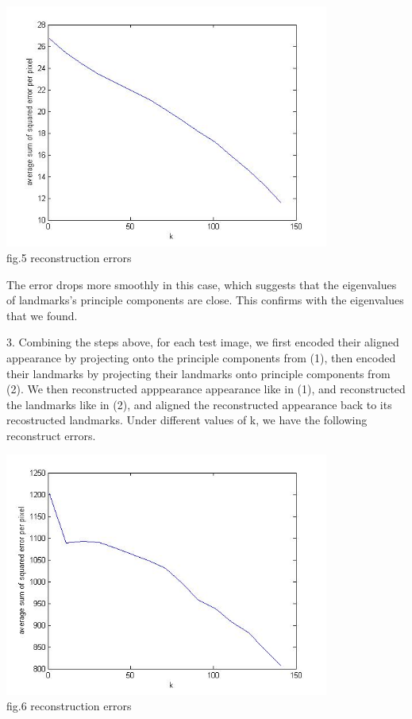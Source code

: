 \documentclass[12pt]{article}
\newenvironment{problem}[2][Part]{\begin{trivlist}
\item[\hskip \labelsep {\bfseries #1}\hskip \labelsep {\bfseries #2}]}{\end{trivlist}}
\begin{document}
\begin{problem}{1. ASM and AAM model for face reconstruction}
\begin{center}
\end{center}
\begin{center}
		\includegraphics[height=8cm]{error_landmark.jpg}{\\fig.5 reconstruction errors}
\end{center}
The error drops more smoothly in this case, which suggests that the eigenvalues of landmarks's principle components are close. This confirms with the eigenvalues that we found.\\
\item{3.}
Combining the steps above, for each test image, we first encoded their aligned appearance by projecting onto the principle components from (1), then encoded their landmarks by projecting their landmarks onto principle components from (2). We then reconstructed apppearance appearance like in (1), and reconstructed the landmarks like in (2), and aligned the reconstructed appearance back to its recostructed landmarks. Under different values of k, we have the following reconstruct errors.
\begin{center}
		\includegraphics[height=8cm]{error_warp.jpg}{\\fig.6 reconstruction errors}

\end{center}
\end{problem}
\end{document}
